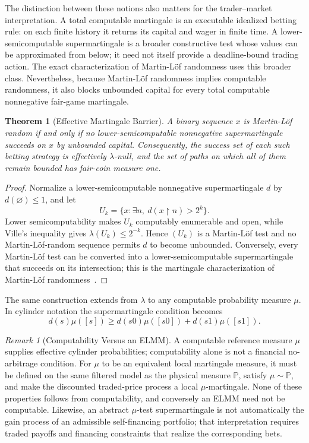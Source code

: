\documentclass[aps,pra,reprint,superscriptaddress,amsmath,amssymb,floatfix]{revtex4-2}
\theoremstyle{plain}
\newtheorem{theorem}{Theorem}
\theoremstyle{definition}
\theoremstyle{remark}
\newtheorem{remark}{Remark}
\begin{document}
The distinction between these notions also matters for the trader--market
interpretation. A total computable martingale is an executable idealized
betting rule: on each finite history it returns its capital and wager in finite
time. A lower-semicomputable supermartingale is a broader constructive test
whose values can be approximated from below; it need not itself provide a
deadline-bound trading action. The exact characterization of Martin-L\"of
randomness uses this broader class. Nevertheless, because Martin-L\"of
randomness implies computable randomness, it also blocks unbounded capital for
every total computable nonnegative fair-game martingale.

\begin{theorem}[Effective Martingale Barrier]
  \label{thm:effective}
  A binary sequence \(x\) is Martin-L\"of random if and only if no
  lower-semicomputable nonnegative supermartingale succeeds on \(x\) by
  unbounded capital. Consequently, the success set of each such betting
  strategy is effectively \(\lambda\)-null, and the set of paths on which all
  of them remain bounded has fair-coin measure one.
\end{theorem}

\begin{proof}
Normalize a lower-semicomputable nonnegative supermartingale \(d\) by
\(d(\varnothing)\leq1\), and let
\[
  U_k=\{x:\exists n,\ d(x{\upharpoonright}n)>2^k\}.
\]
Lower semicomputability makes \(U_k\) computably enumerable and open, while
Ville's inequality gives \(\lambda(U_k)\leq2^{-k}\). Hence
\((U_k)\) is a Martin-L\"of test and no Martin-L\"of-random sequence permits
\(d\) to become unbounded. Conversely, every Martin-L\"of test can be converted
into a lower-semicomputable supermartingale that succeeds on its intersection;
this is the martingale characterization of Martin-L\"of
randomness~\cite{calude:02,Nies2009}.
\end{proof}

The same construction extends from \(\lambda\) to any computable probability
measure \(\mu\). In cylinder notation the supermartingale condition becomes
\[
 d(s)\mu([s])\geq
 d(s0)\mu([s0])+d(s1)\mu([s1]).
\]

\begin{remark}[Computability Versus an ELMM]
A computable reference measure \(\mu\) supplies effective cylinder
probabilities; computability alone is not a financial no-arbitrage condition.
For \(\mu\) to be an equivalent local martingale measure, it must be defined on
the same filtered model as the physical measure \(\mathbb P\), satisfy
\(\mu\sim\mathbb P\), and make the discounted traded-price process a local
\(\mu\)-martingale. None of these properties follows from computability, and
conversely an ELMM need not be computable. Likewise, an abstract
\(\mu\)-test supermartingale is not automatically the gain process of an
admissible self-financing portfolio; that interpretation requires traded
payoffs and financing constraints that realize the corresponding bets.
\end{remark}
\end{document}
